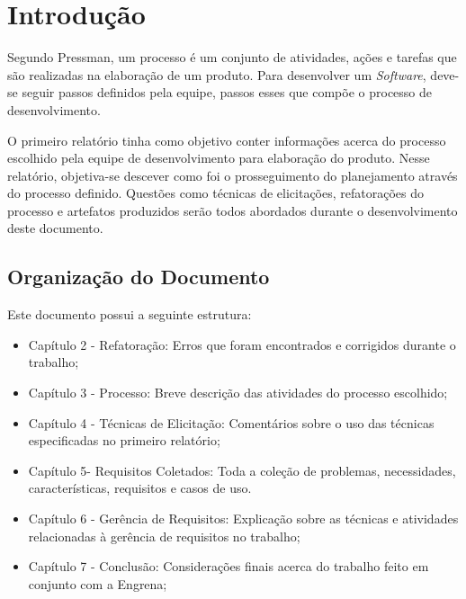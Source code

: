 \chapter{Introdução}
\label{introduction}

Segundo Pressman, um processo é um conjunto de atividades, ações e tarefas que são realizadas na elaboração de um produto. Para desenvolver um \textit{Software}, deve-se seguir passos definidos pela equipe, passos esses que compõe o processo de desenvolvimento.~\cite{pressman}

O primeiro relatório tinha como objetivo conter informações acerca do processo escolhido pela equipe de desenvolvimento para elaboração do produto. Nesse relatório, objetiva-se descever como foi o prosseguimento do planejamento através do processo definido. Questões como técnicas de elicitações, refatorações do processo e artefatos produzidos serão todos abordados durante o desenvolvimento deste documento.

\section{Organização do Documento}

Este documento possui a seguinte estrutura:
\begin{itemize}
\item Capítulo 2 - Refatoração: Erros que foram encontrados e corrigidos durante o trabalho;
\item Capítulo 3 - Processo: Breve descrição das atividades do processo escolhido;
\item Capítulo 4 - Técnicas de Elicitação: Comentários sobre o uso das técnicas especificadas no primeiro relatório;
\item Capítulo 5- Requisitos Coletados: Toda a coleção de problemas, necessidades, características, requisitos e casos de uso.
\item Capítulo 6 - Gerência de Requisitos: Explicação sobre as técnicas e atividades relacionadas à gerência de requisitos no trabalho;
\item Capítulo 7 - Conclusão: Considerações finais acerca do trabalho feito em conjunto com a Engrena;
\end{itemize}

